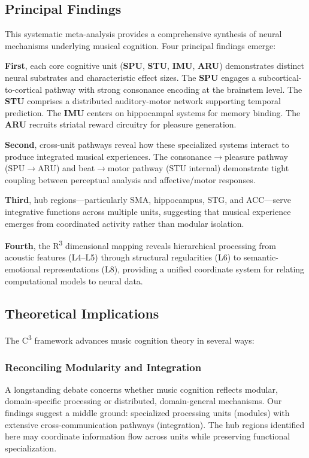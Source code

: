 \documentclass[9pt,onecolumn]{article}
\newcommand{\STU}{\textcolor{stucolor}{\textbf{STU}}}
\newcommand{\IMU}{\textcolor{imucolor}{\textbf{IMU}}}
\newcommand{\SPU}{\textcolor{spucolor}{\textbf{SPU}}}
\newcommand{\ARU}{\textcolor{arucolor}{\textbf{ARU}}}
\newcommand{\Cthree}{C\textsuperscript{3}}
\newcommand{\Rthree}{R\textsuperscript{3}}
\begin{document}
\subsection{Principal Findings}

This systematic meta-analysis provides a comprehensive synthesis of neural mechanisms underlying musical cognition. Four principal findings emerge:

\textbf{First}, each core cognitive unit (\SPU{}, \STU{}, \IMU{}, \ARU{}) demonstrates distinct neural substrates and characteristic effect sizes. The \SPU{} engages a subcortical-to-cortical pathway with strong consonance encoding at the brainstem level. The \STU{} comprises a distributed auditory-motor network supporting temporal prediction. The \IMU{} centers on hippocampal systems for memory binding. The \ARU{} recruits striatal reward circuitry for pleasure generation.

\textbf{Second}, cross-unit pathways reveal how these specialized systems interact to produce integrated musical experiences. The consonance$\rightarrow$pleasure pathway (SPU$\rightarrow$ARU) and beat$\rightarrow$motor pathway (STU internal) demonstrate tight coupling between perceptual analysis and affective/motor responses.

\textbf{Third}, hub regions---particularly SMA, hippocampus, STG, and ACC---serve integrative functions across multiple units, suggesting that musical experience emerges from coordinated activity rather than modular isolation.

\textbf{Fourth}, the \Rthree{} dimensional mapping reveals hierarchical processing from acoustic features (L4--L5) through structural regularities (L6) to semantic-emotional representations (L8), providing a unified coordinate system for relating computational models to neural data.

\subsection{Theoretical Implications}

The \Cthree{} framework advances music cognition theory in several ways:

\subsubsection{Reconciling Modularity and Integration}

A longstanding debate concerns whether music cognition reflects modular, domain-specific processing or distributed, domain-general mechanisms. Our findings suggest a middle ground: specialized processing units (modules) with extensive cross-communication pathways (integration). The hub regions identified here may coordinate information flow across units while preserving functional specialization.
\end{document}
